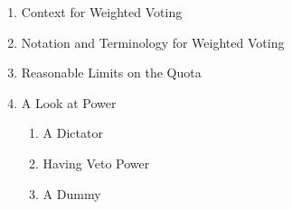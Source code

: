 \documentclass[12pt]{article}
\begin{document}
\begin{enumerate}
\item Context for Weighted Voting\\

\vfill

\item Notation and Terminology for Weighted Voting\\

\vfill

\item Reasonable Limits on the Quota\\
\vspace{1in}
\newpage
\item A Look at Power
	\begin{enumerate}
	\item A Dictator
	\vfill
	\item Having Veto Power
	\vfill
	\item A Dummy 
	\vfill
	\end{enumerate}
	
\end{enumerate}
\end{document}
